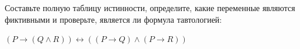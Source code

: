 \question Составьте полную таблицу истинности, определите, какие переменные являются фиктивными и проверьте, является ли формула тавтологией:

$(P \rightarrow (Q \land R)) \leftrightarrow ((P \rightarrow Q) \land (P \rightarrow R))$